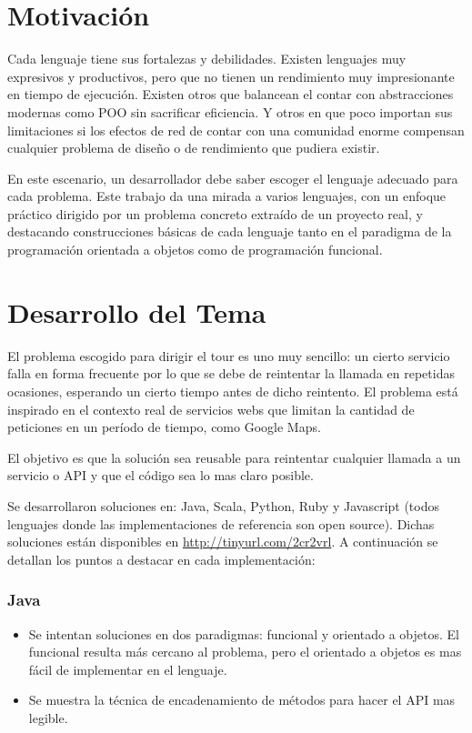 \section*{Motivación}

Cada lenguaje tiene sus fortalezas y debilidades. Existen lenguajes muy
expresivos y productivos, pero que no tienen un rendimiento muy impresionante en
tiempo de ejecución. Existen otros que balancean el contar con abstracciones
modernas como POO sin sacrificar eficiencia. Y otros en que poco importan sus
limitaciones si los efectos de red de contar con una comunidad enorme compensan
cualquier problema de diseño o de rendimiento que pudiera existir.

En este escenario, un desarrollador debe saber escoger el lenguaje adecuado para
cada problema. Este trabajo da una mirada a varios lenguajes, con un enfoque
práctico dirigido por un problema concreto extraído de un proyecto real, y
destacando construcciones básicas de cada lenguaje tanto en el paradigma de la
programación orientada a objetos como de programación funcional.

\section*{Desarrollo del Tema}

El problema escogido para dirigir el tour es uno muy sencillo: un cierto
servicio falla en forma frecuente por lo que se debe de reintentar la llamada en
repetidas ocasiones, esperando un cierto tiempo antes de dicho reintento. El
problema está inspirado en el contexto real de servicios webs que limitan la
cantidad de peticiones en un período de tiempo, como Google Maps.

El objetivo es que la solución sea reusable para reintentar cualquier llamada a
un servicio o API y que el código sea lo mas claro posible.

Se desarrollaron soluciones en: Java, Scala, Python, Ruby y Javascript (todos
lenguajes donde las implementaciones de referencia son open source). Dichas
soluciones están disponibles en \url{http://tinyurl.com/2cr2vrl}. A continuación
se detallan los puntos a destacar en cada implementación:

\subsubsection*{Java}

\begin{itemize}
\item Se intentan soluciones en dos paradigmas: funcional y orientado a
  objetos. El funcional resulta más cercano al problema, pero el orientado a
  objetos es mas fácil de implementar en el lenguaje.
\item Se muestra la técnica de encadenamiento de métodos para hacer el API mas
  legible.
\end{itemize}


